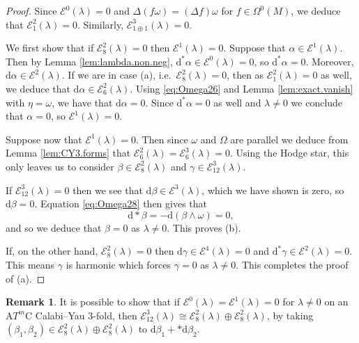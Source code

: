 \documentclass{article}
\theoremstyle{definition}
\newtheorem{rmk}[thm]{Remark}
\numberwithin{thm}{section}
\numberwithin{equation}{section}
\def\d{\mathrm{d}}
\begin{document}
\begin{proof}
 Since $\mathcal{E}^0(\lambda)=0$ and $\Delta(f\omega)=(\Delta f)\omega$ for $f\in\Omega^0(M)$, we deduce that $\mathcal{E}^2_1(\lambda)=0$.  Similarly, $\mathcal{E}^3_{1\oplus 1}(\lambda)=0$. 

 We first show that if $\mathcal{E}^2_8(\lambda)=0$ then $\mathcal{E}^1(\lambda)=0$. 
 Suppose that $\alpha\in\mathcal{E}^1(\lambda)$. Then by Lemma \ref{lem:lambda.non.neg}, $\d^*\alpha\in\mathcal{E}^0(\lambda)=0$, so $\d^*\alpha=0$.  Moreover, $\d\alpha\in\mathcal{E}^2(\lambda)$.   If we are in case (a), i.e.~$\mathcal{E}^2_8(\lambda)=0$, then as $\mathcal{E}^2_1(\lambda)=0$ as well, we deduce that $\d\alpha\in\mathcal{E}^2_6(\lambda)$.  Using \eqref{eq:Omega26} and Lemma \ref{lem:exact.vanish} with $\eta=\omega$, we have that
  $\d\alpha=0$. Since $\d^*\alpha=0$ as well and $\lambda\neq 0$ we conclude that $\alpha=0$, so $\mathcal{E}^1(\lambda)=0$.  

 Suppose now that $\mathcal{E}^1(\lambda)=0$. 
 Then since $\omega$ and $\Omega$ are parallel we  deduce from Lemma \ref{lem:CY3.forms} that $\mathcal{E}^2_6(\lambda)=\mathcal{E}^3_6(\lambda)=0$.  Using the Hodge star, this only leaves us to consider $\beta\in\mathcal{E}^2_8(\lambda)$ and $\gamma\in \mathcal{E}^3_{12}(\lambda)$. 
 
 If $\mathcal{E}^3_{12}(\lambda)=0$ then we see that $\d\beta\in\mathcal{E}^3(\lambda)$, which we have shown is zero, so $\d\beta=0$.  Equation \eqref{eq:Omega28} then gives that
 \begin{equation}
     \d*\beta=-\d(\beta\wedge\omega)=0,
 \end{equation}
 and so we deduce that $\beta=0$ as $\lambda\neq 0$.  This proves (b).  
 
 If, on the other hand, $\mathcal{E}^2_8(\lambda)=0$ then $\d\gamma\in \mathcal{E}^4(\lambda)=0$ and $\d^*\gamma\in\mathcal{E}^2(\lambda)=0$.  This means $\gamma$ is harmonic which forces $\gamma=0$ as $\lambda\neq 0$. This completes the proof of (a).
\end{proof}

\begin{rmk}
    It is possible to show that if $\mathcal{E}^0(\lambda)=\mathcal{E}^1(\lambda)=0$ for $\lambda\neq 0$ on an  A$T^m$C Calabi--Yau 3-fold, then $\mathcal{E}^3_{12}(\lambda)\cong \mathcal{E}^2_8(\lambda)\oplus\mathcal{E}^2_8(\lambda)$,   by taking $(\beta_1,\beta_2)\in \mathcal{E}^2_8(\lambda)\oplus\mathcal{E}^2_8(\lambda)$ to $\d\beta_1+*\d\beta_2$.
\end{rmk}
\end{document}
